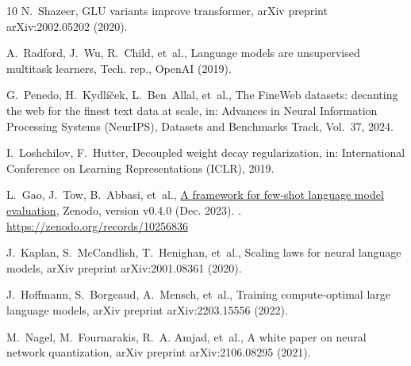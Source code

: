 \documentclass[final,5p,times,twocolumn]{elsarticle}
\theoremstyle{remark}
\begin{document}
\begin{thebibliography}{10}
N.~Shazeer, {GLU variants improve transformer}, arXiv preprint arXiv:2002.05202
  (2020).

A.~Radford, J.~Wu, R.~Child, et~al., {Language models are unsupervised
  multitask learners}, Tech. rep., OpenAI (2019).

G.~Penedo, H.~Kydl{\'i}{\v c}ek, L.~Ben~Allal, et~al., {The FineWeb datasets:
  decanting the web for the finest text data at scale}, in: Advances in Neural
  Information Processing Systems (NeurIPS), Datasets and Benchmarks Track,
  Vol.~37, 2024.

I.~Loshchilov, F.~Hutter, {Decoupled weight decay regularization}, in:
  International Conference on Learning Representations (ICLR), 2019.

L.~Gao, J.~Tow, B.~Abbasi, et~al.,
  \href{https://zenodo.org/records/10256836}{{A framework for few-shot language
  model evaluation}}, Zenodo, version v0.4.0 (Dec. 2023).
\newblock \href {https://doi.org/10.5281/zenodo.10256836}
  {}.
\newline\urlprefix\url{https://zenodo.org/records/10256836}

J.~Kaplan, S.~McCandlish, T.~Henighan, et~al., {Scaling laws for neural
  language models}, arXiv preprint arXiv:2001.08361 (2020).

J.~Hoffmann, S.~Borgeaud, A.~Mensch, et~al., {Training compute-optimal large
  language models}, arXiv preprint arXiv:2203.15556 (2022).

M.~Nagel, M.~Fournarakis, R.~A. Amjad, et~al., {A white paper on neural network
  quantization}, arXiv preprint arXiv:2106.08295 (2021).

\end{thebibliography}
\end{document}
